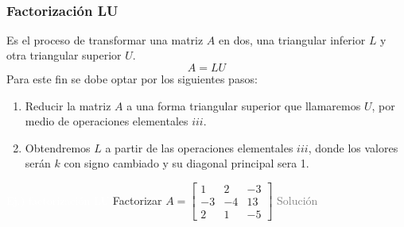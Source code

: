 \hspace*{\fill}\colorbox{gray!55}{ } \\
\subsubsection{Factorización LU}
Es el proceso de transformar una matriz $A$ en dos, una triangular inferior $L$ y otra triangular superior $U$.
$$
	A=LU
$$
Para este fin se dobe optar por los siguientes pasos:
\begin{enumerate}
	\item Reducir la matriz $A$ a una forma triangular superior que llamaremos $U$, por medio de operaciones elementales $iii$.\\
	\item Obtendremos $L$ a partir de las operaciones elementales $iii$, donde los valores serán $k$ con signo cambiado y su diagonal principal sera 1.
\end{enumerate}
\addtocounter{exr}{1} 
\colorbox{gray!55}{\textcolor{white}{Ej.) factorización LU}}
	Factorizar $A=\begin{bmatrix}
		1&2&-3\\
		-3&-4&13\\
		2&1&-5
	\end{bmatrix}$
\textcolor{gray}{Solución }
